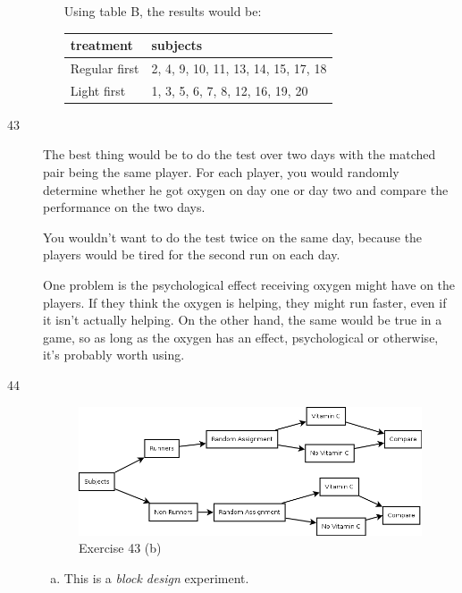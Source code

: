 \documentclass[letterpaper]{exam}
\begin{document}
\begin{description}
\begin{enumerate}[(a)]
            Using table B, the results would be:

            \begin{tabular}[H]{ll}
              \toprule
              treatment     & subjects \\
              \midrule
              Regular first & 2, 4, 9, 10, 11, 13, 14, 15, 17, 18 \\
              Light first   & 1, 3, 5, 6,   7,  8, 12, 16, 19, 20 \\
              \bottomrule
            \end{tabular}
        \end{enumerate}

      \item[43]
        The best thing would be to do the test over two days with the matched
        pair being the same player.  For each player, you would randomly
        determine whether he got oxygen on day one or day two and compare the
        performance on the two days.

        You wouldn't want to do the test twice on the same day, because the
        players would be tired for the second run on each day.

        One problem is the psychological effect receiving oxygen might have on
        the players.  If they think the oxygen is helping, they might run
        faster, even if it isn't actually helping.  On the other hand, the same
        would be true in a game, so as long as the oxygen has an effect,
        psychological or otherwise, it's probably worth using.

      \item[44]
        \begin{figure}[H]
          \centering
          \includegraphics[scale = 0.3]{ex43.png}
          \caption{Exercise 43 (b)}
          \label{fig:ex43}
        \end{figure}
        \begin{enumerate}[(a)]
          \item This is a {\em block design} experiment.


\end{enumerate}
\end{description}
\end{document}
